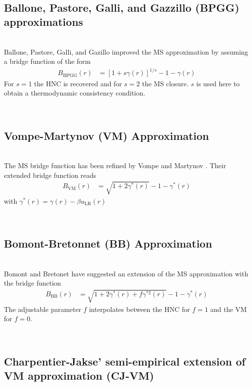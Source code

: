 \vphantom{.}~\\
\subsection{Ballone, Pastore, Galli, and Gazzillo (BPGG) approximations }
~\\

Ballone, Pastore, Galli, and Gazillo  \cite{Ballone1986}
improved the MS approximation by assuming a bridge function of the form
\begin{align}
B_\text{BPGG}(r) &= \left[1+s\gamma(r)\right]^{1/s}-1-\gamma(r)
\end{align}
For $s=1$ the HNC is recovered and for $s=2$ the MS closure. $s$ is used here to
obtain a thermodynamic consistency condition.

\vphantom{.}~\\
\subsection{Vompe-Martynov (VM) Approximation}
~\\

The MS bridge function \cite{Martynov1983} has been refined by Vompe and Martynov \cite{Vompe1994}.
Their extended bridge function reads
\begin{align}
B_\text{VM}(r) &= \sqrt{1+2\gamma^*(r)}-1-\gamma^*(r)
\end{align}
with $\gamma^*(r) = \gamma(r) - \beta u_\text{LR}(r)$

\vphantom{.}~\\
\subsection{Bomont-Bretonnet (BB) Approximation}
~\\

Bomont and Bretonet \cite{Bomont2003,Bomont2004} have suggested an
extension of the MS approximation with the bridge function
\begin{align}
B_\text{BB}(r) &=
\sqrt{1+2\gamma^*(r)+f\gamma^{*2}(r)}-1-\gamma^*(r)
\end{align}
The adjustable parameter $f$ interpolates between the HNC for $f=1$ and the
VM for $f=0$.

\vphantom{.}~\\
\subsection{Charpentier-Jakse' semi-empirical extension of VM approximation (CJ-VM)}
~\\

